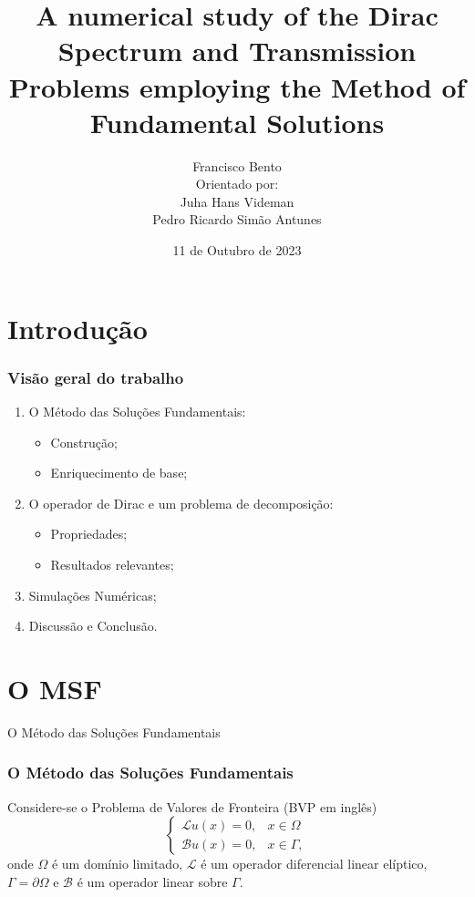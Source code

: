 \documentclass[portuguese,notheorems]{beamer}
\title{A numerical study of the Dirac Spectrum and Transmission Problems employing the
Method of Fundamental Solutions}
\author{Francisco Bento \\ \scriptsize{\vspace{0.2cm} Orientado por: \\ \vspace{0.1cm} Juha Hans Videman \\ Pedro Ricardo Simão Antunes}}
\institute{Instituto Superior Técnico - Lisboa, Portugal}
\date{11 de Outubro de 2023}
\begin{document}
\frame{\titlepage}

\section{Introdução}

\begin{frame}\frametitle{Visão geral do trabalho}
    \begin{enumerate}
        \pause\item O Método das Soluções Fundamentais:
            \begin{itemize}
                \item Construção;
                \item Enriquecimento de base;
            \end{itemize}
        \pause\item O operador de Dirac e um problema de decomposição:
            \begin{itemize}
                \item Propriedades;
                \item Resultados relevantes;
            \end{itemize}
        \pause\item Simulações Numéricas;
        \pause\item Discussão e Conclusão.
    \end{enumerate}
\end{frame}

\section{O MSF}

\begin{frame}
    \centering
    \LARGE
    O Método das Soluções Fundamentais
\end{frame}

\begin{frame}\frametitle{O Método das Soluções Fundamentais}
    Considere-se o Problema de Valores de Fronteira (BVP em inglês)
    \[
        \begin{cases}
            \mathcal{L}u(x) = 0, & x \in \Omega\\
            \mathcal{B}u(x) = 0, & x \in \Gamma,
        \end{cases}
    \]
    onde $\Omega$ é um domínio limitado, $\mathcal{L}$ é um operador diferencial linear elíptico, \(\Gamma = \partial\Omega\) e \(\mathcal{B}\) é um operador linear sobre \(\Gamma\).
\end{frame}
\end{document}
